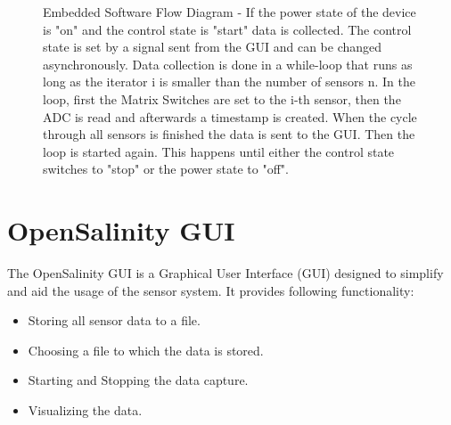 \begin{figure}
\begin{center}
		\caption[Embedded Software Flow Diagram]{Embedded Software Flow Diagram - If the power state of the device is "on" and  the control state is "start" data is collected. The control state is set by a signal sent from the GUI and can be changed asynchronously. Data collection is done in a while-loop that runs as long as the iterator i is smaller than the number of sensors n. In the loop, first the Matrix Switches are set to the i-th sensor, then the ADC is read and afterwards a timestamp is created. When the cycle through all sensors is finished the data is sent to the GUI. Then the loop is started again. This happens until either the control state switches to "stop" or the power state to "off".}
		\label{fig:flow}
	\end{center}
\end{figure}

\section{OpenSalinity GUI}

The OpenSalinity GUI is a Graphical User Interface (GUI) designed to simplify and aid the usage of the sensor system. It provides following functionality:

\begin{itemize}
	\item Storing all sensor data to a file.
	\item Choosing a file to which the data is stored.
	\item Starting and Stopping the data capture.
	\item Visualizing the data.
\end{itemize}

